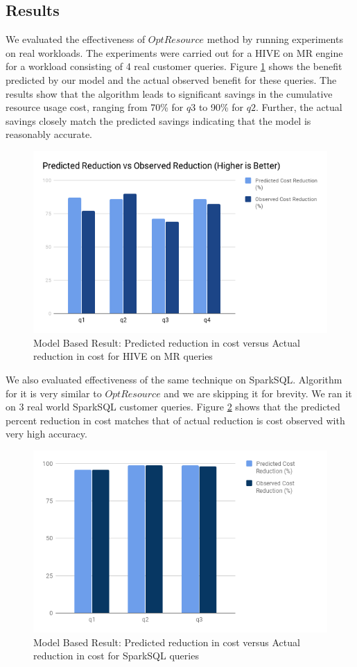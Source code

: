 \subsection{Results}
We evaluated the effectiveness of $OptResource$ method by running experiments on real workloads. The experiments were carried out for a HIVE on MR engine for a workload consisting of 4 real customer queries. 
Figure \ref{fig:modelbasedresult} shows the benefit predicted by our model and the actual observed benefit for these queries. The results show that the algorithm leads to significant savings in the cumulative resource usage cost, ranging from 70\% for $q3$ to 90\% for $q2$. Further, the actual savings closely match the predicted savings indicating that the model is reasonably accurate.

\begin{figure}[h]
	\includegraphics[width=\linewidth]{chart.png}
	\caption{Model Based Result: Predicted reduction in cost versus Actual reduction in cost for HIVE on MR queries}
	\label{fig:modelbasedresult}
\end{figure}

We also evaluated effectiveness of the same technique on SparkSQL. Algorithm for it is very similar to $OptResource$ and we are skipping it for brevity. We ran it on 3 real world SparkSQL customer queries. Figure \ref{fig:modelbasedresultspark} shows that the predicted percent reduction in cost matches that of actual reduction is cost observed with very high accuracy.

\begin{figure}[h]
	\includegraphics[width=\linewidth]{chart_spark.png}
	\caption{Model Based Result: Predicted reduction in cost versus Actual reduction in cost for SparkSQL queries}
	\label{fig:modelbasedresultspark}
\end{figure}